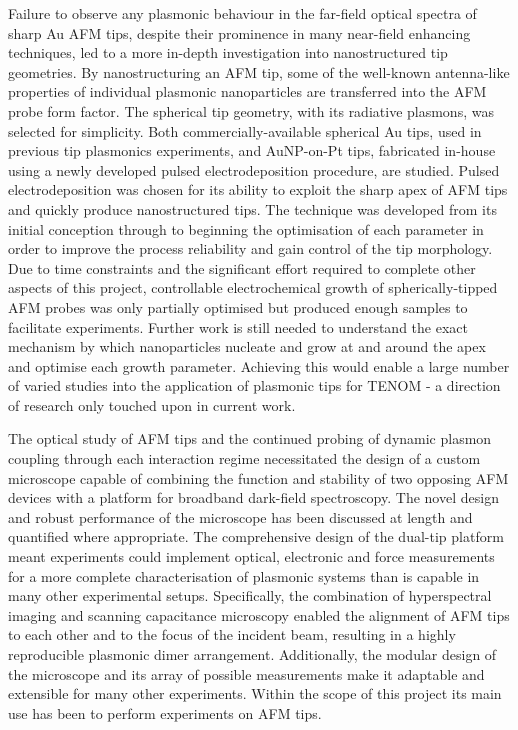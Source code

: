 \documentclass[12pt, a4paper, oneside]{book}
\begin{document}
Failure to observe any plasmonic behaviour in the far-field optical spectra of sharp Au AFM tips, despite their prominence in many near-field enhancing techniques, led to a more in-depth investigation into nanostructured tip geometries. By nanostructuring an AFM tip, some of the well-known antenna-like properties of individual plasmonic nanoparticles are transferred into the AFM probe form factor. The spherical tip geometry, with its radiative plasmons, was selected for simplicity. Both commercially-available spherical Au tips, used in previous tip plasmonics experiments, and AuNP-on-Pt tips, fabricated in-house using a newly developed pulsed electrodeposition procedure, are studied. Pulsed electrodeposition was chosen for its ability to exploit the sharp apex of AFM tips and quickly produce nanostructured tips. The technique was developed from its initial conception through to beginning the optimisation of each parameter in order to improve the process reliability and gain control of the tip morphology. Due to time constraints and the significant effort required to complete other aspects of this project, controllable electrochemical growth of spherically-tipped AFM probes was only partially optimised but produced enough samples to facilitate experiments.
Further work is still needed to understand the exact mechanism by which nanoparticles nucleate and grow at and around the apex and optimise each growth parameter. Achieving this would enable a large number of varied studies into the application of plasmonic tips for TENOM - a direction of research only touched upon in current work.

The optical study of AFM tips and the continued probing of dynamic plasmon coupling through each interaction regime necessitated the design of a custom microscope capable of combining the function and stability of two opposing AFM devices with a platform for broadband dark-field spectroscopy. The novel design and robust performance of the microscope has been discussed at length and quantified where appropriate. The comprehensive design of the dual-tip platform meant experiments could implement optical, electronic and force measurements for a more complete characterisation of plasmonic systems than is capable in many other experimental setups. Specifically, the combination of hyperspectral imaging and scanning capacitance microscopy enabled the alignment of AFM tips to each other and to the focus of the incident beam, resulting in a highly reproducible plasmonic dimer arrangement. Additionally, the modular design of the microscope and its array of possible measurements make it adaptable and extensible for many other experiments. Within the scope of this project its main use has been to perform experiments on AFM tips.
\end{document}
